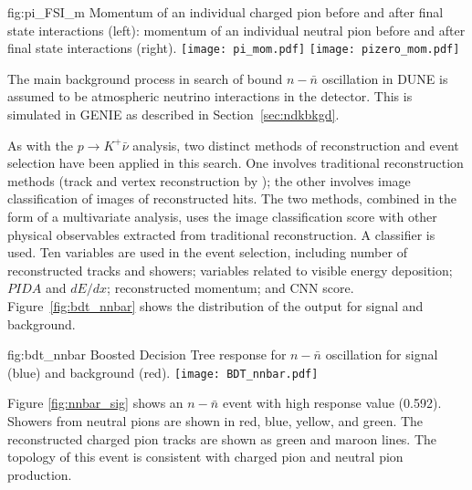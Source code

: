 \begin{dunefigure}
{fig:pi_FSI_m}
{Momentum of an individual charged pion before and after final state interactions (left): momentum of an individual neutral pion before and after final state interactions (right).}
\texttt{[image: pi\_mom.pdf]}
\texttt{[image: pizero\_mom.pdf]}
\end{dunefigure} 

The main background process in search of bound $n-\bar{n}$ oscillation in DUNE is assumed to be atmospheric neutrino interactions in the detector.  This is simulated in GENIE as described in Section~\ref{sec:ndkbkgd}.

As with the $p\rightarrow K^{+} \bar{\nu}$ analysis, two distinct methods of reconstruction and event selection have been applied in this search. One involves traditional reconstruction methods (\threed track and vertex reconstruction by ); 
the other involves image classification 
of \twod images of reconstructed hits. The two methods, combined in the form of a multivariate analysis, uses the image classification score with other physical observables extracted from traditional reconstruction.  A  classifier is used. Ten variables are used in the  event selection, including number of reconstructed tracks and showers; variables related to visible energy deposition; $PIDA$ and $dE/dx$; reconstructed momentum; and CNN score.  Figure~\ref{fig:bdt_nnbar} shows the distribution of the  output for signal and background.

\begin{dunefigure}
{fig:bdt_nnbar}
{Boosted Decision Tree response for $n-\bar{n}$ oscillation for signal (blue) and background (red).}
\texttt{[image: BDT\_nnbar.pdf]}
\end{dunefigure} 


Figure \ref{fig:nnbar_sig} shows an $n-\bar{n}$ event with high  response value (0.592). Showers from neutral pions are shown in red, blue, yellow, and green. The reconstructed charged pion tracks are shown as green and maroon lines. The topology of this event is consistent with charged pion and neutral pion production. 


